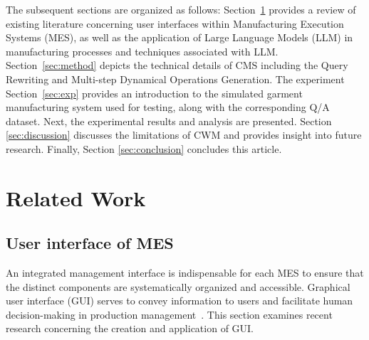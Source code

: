 \documentclass[preprint,12pt]{elsarticle}
\begin{document}
The subsequent sections are organized as follows:
Section~\ref{sec:related_work} provides a review of existing literature concerning user interfaces within Manufacturing Execution Systems (MES), as well as the application of Large Language Models (LLM) in manufacturing processes and techniques associated with LLM.
Section~\ref{sec:method} depicts the technical details of CMS including the Query Rewriting and Multi-step Dynamical Operations Generation.
The experiment Section~\ref{sec:exp} provides an introduction to the simulated garment manufacturing system used for testing, along with the corresponding Q/A dataset.
Next, the experimental results and analysis are presented.
Section \ref{sec:discussion} discusses the limitations of CWM and provides insight into future research. 
Finally, Section \ref{sec:conclusion} concludes this article.


\section{Related Work}
\label{sec:related_work}
\subsection{User interface of MES}
An integrated management interface is indispensable for each MES to ensure that the distinct components are systematically organized and accessible.
Graphical user interface (GUI) serves to convey information to users and facilitate human decision-making in production management~\cite{SHOJAEINASAB2022503}. 
This section examines recent research concerning the creation and application of GUI. 
\end{document}
